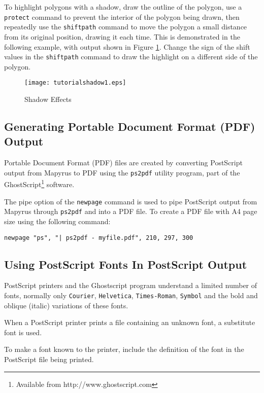 To highlight polygons with a shadow, draw the outline of the polygon, use a
\texttt{protect} command to prevent the interior of the polygon being drawn,
then repeatedly use the \texttt{shiftpath} command to move the polygon a small
distance from its original position, drawing it each time.  This is
demonstrated in the following example, with output shown in Figure
\ref{tutorialshadow1}.  Change the sign of the shift values in the
\texttt{shiftpath} command to draw the highlight on a different side of the
polygon.



\begin{figure}[htb]
\texttt{[image: tutorialshadow1.eps]}
\caption{Shadow Effects}
\label{tutorialshadow1}
\end{figure}

\subsection{Generating Portable Document Format (PDF) Output}
\label{pdf}

Portable Document Format (PDF) files are created by converting PostScript
output from Mapyrus to PDF using the \texttt{ps2pdf} utility program, part of
the GhostScript\footnote{Available from http://www.ghostscript.com} software.

The pipe option of the \texttt{newpage} command is used to pipe PostScript
output from Mapyrus through \texttt{ps2pdf} and into a PDF file.  To create
a PDF file with A4 page size using the following command:

\begin{verbatim}
newpage "ps", "| ps2pdf - myfile.pdf", 210, 297, 300
\end{verbatim}

\subsection{Using PostScript Fonts In PostScript Output}
\label{psfonts}

PostScript printers and the Ghostscript program
understand a limited number of fonts,
normally only \texttt{Courier},
\texttt{Helvetica}, \texttt{Times-Roman}, \texttt{Symbol} and the bold
and oblique (italic) variations of these fonts.

When a PostScript printer prints a file containing an unknown font,
a substitute font is used.

To make a font known to the printer, include the definition of
the font in the PostScript file being printed.

